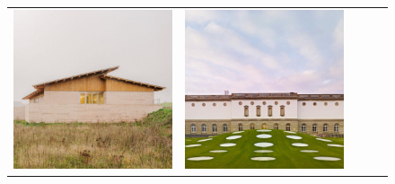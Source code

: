 \begin{figure}[H]
{\begin{tabular}{@{}ccccc@{}}
      \includegraphics[width=\linewidth]{Images/LoRAs/Geleding/Training_images/11.jpg} &
      \includegraphics[width=\linewidth]{Images/LoRAs/Geleding/Training_images/12.jpg} &

\end{tabular}}
\end{figure}
